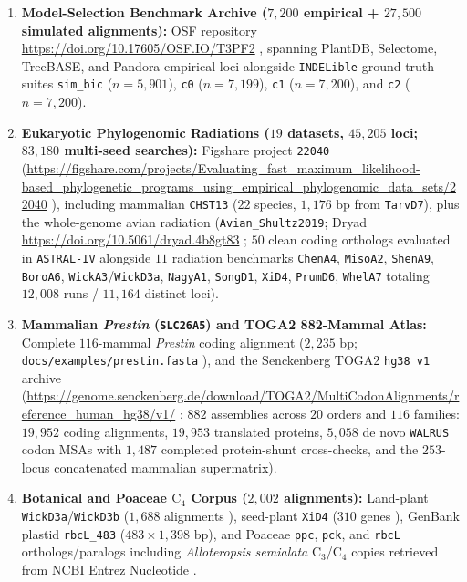 \documentclass[12pt]{article}
\begin{document}
\begin{enumerate}
    \item \textbf{Model-Selection Benchmark Archive ($7,200$ empirical + $27,500$ simulated alignments):} OSF repository \url{https://doi.org/10.17605/OSF.IO/T3PF2} \cite{abadi2019model,gerth2019cannot}, spanning PlantDB, Selectome, TreeBASE, and Pandora empirical loci alongside \texttt{INDELible} ground-truth suites \texttt{sim\_bic} ($n = 5,901$), \texttt{c0} ($n = 7,199$), \texttt{c1} ($n = 7,200$), and \texttt{c2} ($n = 7,200$).
    \item \textbf{Eukaryotic Phylogenomic Radiations ($19$ datasets, $45,205$ loci; $83,180$ multi-seed searches):} Figshare project \texttt{22040} (\url{https://figshare.com/projects/Evaluating_fast_maximum_likelihood-based_phylogenetic_programs_using_empirical_phylogenomic_data_sets/22040} \cite{shen2017contentious,zhou2018evaluating}), including mammalian \texttt{CHST13} ($22$ species, $1,176\text{ bp}$ from \texttt{TarvD7}), plus the whole-genome avian radiation (\texttt{Avian\_Shultz2019}; Dryad \url{https://doi.org/10.5061/dryad.4b8gt83} \cite{shultz2019widespread}; $50$ clean coding orthologs evaluated in \texttt{ASTRAL-IV} alongside $11$ radiation benchmarks \texttt{ChenA4}, \texttt{MisoA2}, \texttt{ShenA9}, \texttt{BoroA6}, \texttt{WickA3}/\texttt{WickD3a}, \texttt{NagyA1}, \texttt{SongD1}, \texttt{XiD4}, \texttt{PrumD6}, \texttt{WhelA7} totaling $12,008$ runs / $11,164$ distinct loci).
    \item \textbf{Mammalian \textit{Prestin} (\texttt{SLC26A5}) and TOGA2 882-Mammal Atlas:} Complete $116$-mammal \textit{Prestin} coding alignment ($2,235\text{ bp}$; \texttt{docs/examples/prestin.fasta} \cite{liu2010convergent,li2010hearing}), and the Senckenberg TOGA2 \texttt{hg38 v1} archive (\url{https://genome.senckenberg.de/download/TOGA2/MultiCodonAlignments/reference_human_hg38/v1/} \cite{kirilenko2023integrating,malovichko2026toga2}; $882$ assemblies across $20$ orders and $116$ families: $19,952$ coding alignments, $19,953$ translated proteins, $5,058$ de novo \texttt{WALRUS} codon MSAs with $1,487$ completed protein-shunt cross-checks, and the $253$-locus concatenated mammalian supermatrix).
    \item \textbf{Botanical and Poaceae $\text{C}_4$ Corpus ($2,002$ alignments):} Land-plant \texttt{WickD3a}/\texttt{WickD3b} ($1,688$ alignments \cite{wickett2014phylotranscriptomic}), seed-plant \texttt{XiD4} ($310$ genes \cite{xi2014coalescent}), GenBank plastid \texttt{rbcL\_483} ($483 \times 1,398\text{ bp}$), and Poaceae \texttt{ppc}, \texttt{pck}, and \texttt{rbcL} orthologs/paralogs including \textit{Alloteropsis semialata} $\text{C}_3$/$\text{C}_4$ copies retrieved from NCBI Entrez Nucleotide \cite{christin2007c4,christin2012adaptive,dunning2019pangenome}.

\end{enumerate}
\end{document}
